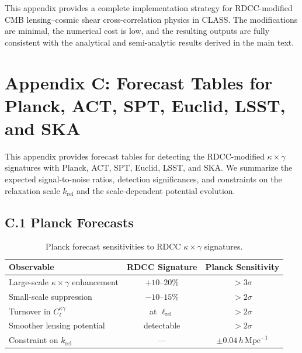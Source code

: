 \documentclass[11pt,a4paper]{article}
\begin{document}
This appendix provides a complete implementation strategy for RDCC-modified 
CMB lensing--cosmic shear cross-correlation physics in CLASS. The modifications are minimal, 
the numerical cost is low, and the resulting outputs are fully consistent with the 
analytical and semi-analytic results derived in the main text.

\section*{Appendix C: Forecast Tables for Planck, ACT, SPT, Euclid, LSST, and SKA}

This appendix provides forecast tables for detecting the RDCC-modified 
$\kappa \times \gamma$ signatures with Planck, ACT, SPT, Euclid, LSST, and SKA. We summarize 
the expected signal-to-noise ratios, detection significances, and constraints on the 
relaxation scale $k_{\mathrm{rel}}$ and the scale-dependent potential evolution.

\subsection*{C.1 Planck Forecasts}

\begin{table}[H]
\centering
\begin{tabular}{lcc}
\hline
\textbf{Observable} & \textbf{RDCC Signature} & \textbf{Planck Sensitivity} \\
\hline
Large-scale $\kappa \times \gamma$ enhancement & $+10$--$20\%$ & $>3\sigma$ \\
Small-scale suppression & $-10$--$15\%$ & $>2\sigma$ \\
Turnover in $C_{\ell}^{\kappa\gamma}$ & at $\ell_{\mathrm{rel}}$ & $>2\sigma$ \\
Smoother lensing potential & detectable & $>2\sigma$ \\
Constraint on $k_{\mathrm{rel}}$ & --- & $\pm 0.04\,h\,\mathrm{Mpc}^{-1}$ \\
\hline
\end{tabular}
\caption{Planck forecast sensitivities to RDCC $\kappa \times \gamma$ signatures.}
\end{table}
\end{document}
